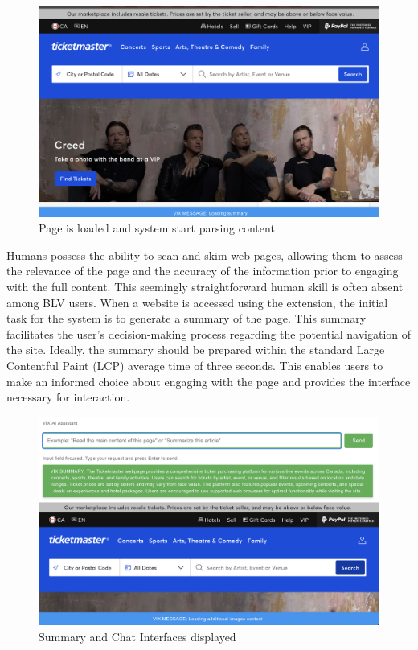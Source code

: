 \documentclass[conference]{IEEEtran}
\begin{document}
\begin{figure}[h]
\centering
\includegraphics[width=\columnwidth]{images/1.png}
\caption{Page is loaded and system start parsing content}
\label{fig:start}
\end{figure}


Humans possess the ability to scan and skim web pages, allowing them to assess the relevance of the page and the accuracy of the information prior to engaging with the full content. This seemingly straightforward human skill is often absent among BLV users. When a website is accessed using the extension, the initial task for the system is to generate a summary of the page. This summary facilitates the user's decision-making process regarding the potential navigation of the site. Ideally, the summary should be prepared within the standard Large Contentful Paint (LCP) average time of three seconds. This enables users to make an informed choice about engaging with the page and provides the interface necessary for interaction.

\begin{figure}[h]
\centering
\includegraphics[width=\columnwidth]{images/2.png}
\caption{Summary and Chat Interfaces displayed}
\label{fig:chat}
\end{figure}
\end{document}
